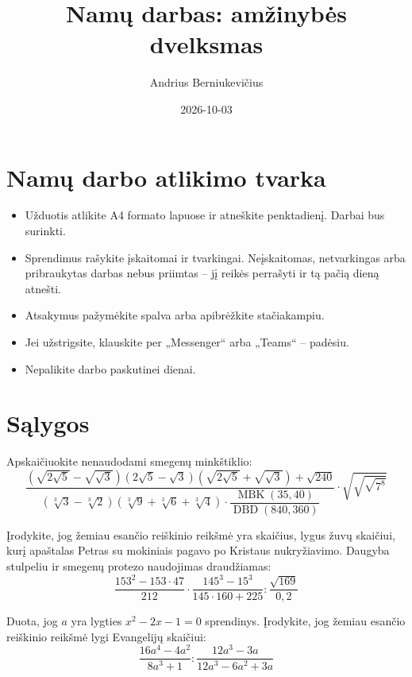 \documentclass[12pt, a4paper]{scrartcl}
\title{\textbf{Namų darbas: amžinybės dvelksmas}}
\author{Andrius Berniukevičius}
\date{2026-10-03}
\begin{document}
\maketitle

\section*{Namų darbo atlikimo tvarka}

\begin{itemize}[leftmargin=*]
    \item Užduotis atlikite A4 formato lapuose ir atneškite penktadienį. Darbai bus surinkti.
    \item Sprendimus rašykite įskaitomai ir tvarkingai. Neįskaitomas, netvarkingas arba pribraukytas darbas nebus priimtas – jį reikės perrašyti ir tą pačią dieną atnešti.
    \item Atsakymus pažymėkite spalva arba apibrėžkite stačiakampiu.
    \item Jei užstrigsite, klauskite per „Messenger“ arba „Teams“ – padėsiu.
    \item Nepalikite darbo paskutinei dienai.
\end{itemize}

\section{Sąlygos}

\begin{problem}
Apskaičiuokite nenaudodami smegenų minkštiklio:
\[
\frac{
    \left(\sqrt{2\sqrt{5}}-\sqrt{\sqrt{3}}\right)
    (2\sqrt{5}-\sqrt{3})
    \left(\sqrt{2\sqrt{5}}+\sqrt{\sqrt{3}}\right)
    +\sqrt{240}
}{
    \left(\sqrt[3]{3}-\sqrt[3]{2}\right)
    \left(\sqrt[3]{9}+\sqrt[3]{6}+\sqrt[3]{4}\right)
    \cdot \dfrac{\operatorname{MBK}(35,40)}{\operatorname{DBD}(840,360)}
}
\cdot \sqrt{\sqrt{\sqrt{7^8}}}
\]
\end{problem}

\begin{problem}
Įrodykite, jog žemiau esančio reiškinio reikšmė yra skaičius, lygus žuvų skaičiui, kurį apaštalas Petras su mokiniais pagavo po Kristaus nukryžiavimo. Daugyba stulpeliu ir smegenų protezo naudojimas draudžiamas:
\[
\frac{153^2-153\cdot 47}{212}
\cdot
\frac{145^3-15^3}{145\cdot 160+225}
\mathbin{:}
\frac{\sqrt{169}}{0{,}2}
\]
\end{problem}

\begin{problem}
Duota, jog $a$ yra lygties $x^2-2x-1=0$ sprendinys. Įrodykite, jog žemiau esančio reiškinio reikšmė lygi Evangelijų skaičiui:
\[
\frac{16a^4-4a^2}{8a^3+1}
\mathbin{:}
\frac{12a^3-3a}{12a^3-6a^2+3a}
\]
\end{problem}
\end{document}

